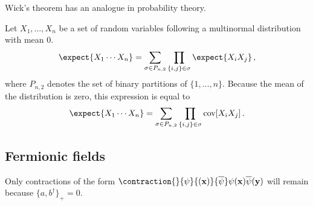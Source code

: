     Wick's theorem has an analogue in probability theory.
    \begin{theorem}[Isserlis]
        Let $X_1,\ldots,X_n$ be a set of random variables following a multinormal distribution with mean 0.
        \begin{gather}
            \expect{X_1\cdots X_n} = \sum_{\sigma\in P_{n,2}}\prod_{\{i,j\}\in\sigma}\expect{X_iX_j}\,,
        \end{gather}
        where $P_{n,2}$ denotes the set of binary partitions of $\{1,\ldots,n\}$. Because the mean of the distribution is zero, this expression is equal to
        \begin{gather}
            \expect{X_1\cdots X_n} = \sum_{\sigma\in P_{n,2}}\prod_{\{i,j\}\in\sigma}\mathrm{cov}[X_iX_j]\,.
        \end{gather}
    \end{theorem}

\subsection{Fermionic fields}

    \begin{remark}
        Only contractions of the form $\contraction{}{\psi}{(\mathbf{x})}{\overline\psi}\psi(\mathbf{x})\overline\psi(\mathbf{y})$ will remain because $\{a,b^\dag\}_+=0$.
    \end{remark}



